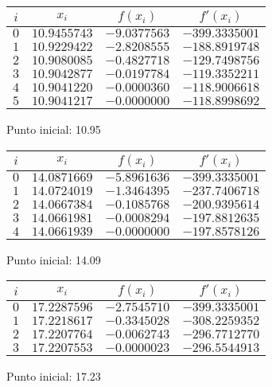 \begin{figure}[H]
	\centering
	\caption{Punto inicial: 10.95}
	\begin{tabular}{|c|c|c|c|} \hline
		$i$ & $x_{i}$ & $f(x_{i})$ & $f'(x_{i})$ \\ \hline
		$0$ & $10.9455743$ & $-9.0377563$ & $-399.3335001$ \\ \hline
		$1$ & $10.9229422$ & $-2.8208555$ & $-188.8919748$ \\ \hline
		$2$ & $10.9080085$ & $-0.4827718$ & $-129.7498756$ \\ \hline
		$3$ & $10.9042877$ & $-0.0197784$ & $-119.3352211$ \\ \hline
		$4$ & $10.9041220$ & $-0.0000360$ & $-118.9006618$ \\ \hline
		$5$ & $10.9041217$ & $-0.0000000$ & $-118.8998692$ \\ \hline
	\end{tabular}
\end{figure}
\begin{figure}[H]
	\centering
	\caption{Punto inicial: 14.09}
	\begin{tabular}{|c|c|c|c|} \hline
		$i$ & $x_{i}$ & $f(x_{i})$ & $f'(x_{i})$ \\ \hline
		$0$ & $14.0871669$ & $-5.8961636$ & $-399.3335001$ \\ \hline
		$1$ & $14.0724019$ & $-1.3464395$ & $-237.7406718$ \\ \hline
		$2$ & $14.0667384$ & $-0.1085768$ & $-200.9395614$ \\ \hline
		$3$ & $14.0661981$ & $-0.0008294$ & $-197.8812635$ \\ \hline
		$4$ & $14.0661939$ & $-0.0000000$ & $-197.8578126$ \\ \hline
	\end{tabular}
\end{figure}
\begin{figure}[H]
	\centering
	\caption{Punto inicial: 17.23}
	\begin{tabular}{|c|c|c|c|} \hline
		$i$ & $x_{i}$ & $f(x_{i})$ & $f'(x_{i})$ \\ \hline
		$0$ & $17.2287596$ & $-2.7545710$ & $-399.3335001$ \\ \hline
		$1$ & $17.2218617$ & $-0.3345028$ & $-308.2259352$ \\ \hline
		$2$ & $17.2207764$ & $-0.0062743$ & $-296.7712770$ \\ \hline
		$3$ & $17.2207553$ & $-0.0000023$ & $-296.5544913$ \\ \hline
	\end{tabular}
\end{figure}
